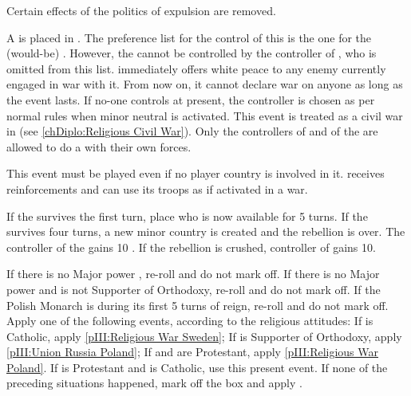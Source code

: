 \effetlong
{} Certain effects of the politics of
expulsion are removed.








\phevnt
\aparag A \REVOLT \faceplus is placed in \provinceCorsica. The preference list
for the control of this \REVOLT is the one for the (would-be) \paysCorse.
However, the \REVOLT cannot be controlled by the controller of \paysGenes, who
is omitted from this list.
\aparag \paysGenes immediately offers white peace to any enemy currently
engaged in war with it.  From now on, it cannot declare war on anyone as long
as the event lasts.
\aparag If no-one controls \paysGenes at present, the controller is chosen as
per normal rules when minor neutral is activated.
\aparag This event is treated as a civil war in \paysGenes (see
\ref{chDiplo:Religious Civil War}). Only the controllers of \paysGenes and of
the \REVOLT are allowed to do a  with their own
forces.

\phadm
\aparag This event must be played even if no player country is involved in
it. \paysGenes receives reinforcements and can use its troops as if activated
in a war.

\phinter
\aparag If the \REVOLT survives the first turn, place \leaderSampiero who is
now available for 5 turns.
\aparag If the \REVOLT survives four turns, a new minor country \paysCorse is
created and the rebellion is over. The controller of the \REVOLT gains 10
\VPs.
\aparag If the rebellion is crushed, controller of \paysGenes gains 10\VPs.




\condition{}
\aparag If there is no Major power \POL, re-roll and do not mark off.
\aparag If there is no Major power \SUE and \POL is not Supporter of
Orthodoxy, re-roll and do not mark off.
\aparag If the Polish Monarch is  during its first 5 turns
of reign, re-roll and do not mark off.
\aparag Apply one of the following events, according to the religious
attitudes:
\bparag If \SUE is Catholic, apply \ref{pIII:Religious War Sweden};
\bparag If \POL is Supporter of Orthodoxy, apply \ref{pIII:Union Russia
  Poland};
\bparag If \POL and \SUE are Protestant, apply \ref{pIII:Religious War
  Poland}.
\bparag If \SUE is Protestant and \POL is Catholic, use this present event.
\bparag If none of the preceding situations happened, mark off the box and
apply \RD.

